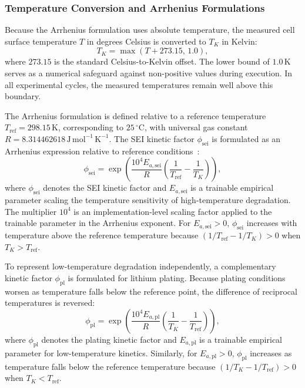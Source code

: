 \documentclass[a4paper,fleqn]{cas-sc}
\begin{document}
\subsubsection{Temperature Conversion and Arrhenius Formulations}

Because the Arrhenius formulation uses absolute temperature, the measured cell surface temperature $T$ in degrees Celsius is converted to $T_K$ in Kelvin:
\begin{equation}
T_K = \max(T + 273.15,\, 1.0),
\label{eq:kelvin}
\end{equation}
where $273.15$ is the standard Celsius-to-Kelvin offset. The lower bound of $1.0\,\mathrm{K}$ serves as a numerical safeguard against non-positive values during execution. In all experimental cycles, the measured temperatures remain well above this boundary.

The Arrhenius formulation is defined relative to a reference temperature $T_{\mathrm{ref}} = 298.15\,\mathrm{K}$, corresponding to $25\,^\circ\mathrm{C}$, with universal gas constant $R = 8.314462618\,\mathrm{J\,mol^{-1}\,K^{-1}}$. The SEI kinetic factor $\phi_{\mathrm{sei}}$ is formulated as an Arrhenius expression relative to reference conditions~\citep{kucinskis2022arrhenius}:
\begin{equation}
\phi_{\mathrm{sei}} = \exp\!\left(\frac{10^4 E_{a,\mathrm{sei}}}{R}\left(\frac{1}{T_{\mathrm{ref}}} - \frac{1}{T_K}\right)\right),
\label{eq:arrhenius-sei}
\end{equation}
where $\phi_{\mathrm{sei}}$ denotes the SEI kinetic factor and $E_{a,\mathrm{sei}}$ is a trainable empirical parameter scaling the temperature sensitivity of high-temperature degradation. The multiplier $10^4$ is an implementation-level scaling factor applied to the trainable parameter in the Arrhenius exponent. For $E_{a,\mathrm{sei}} > 0$, $\phi_{\mathrm{sei}}$ increases with temperature above the reference temperature because $(1/T_{\mathrm{ref}} - 1/T_K) > 0$ when $T_K > T_{\mathrm{ref}}$.

To represent low-temperature degradation independently, a complementary kinetic factor $\phi_{\mathrm{pl}}$ is formulated for lithium plating. Because plating conditions worsen as temperature falls below the reference point, the difference of reciprocal temperatures is reversed:
\begin{equation}
\phi_{\mathrm{pl}} = \exp\!\left(\frac{10^4 E_{a,\mathrm{pl}}}{R}\left(\frac{1}{T_K} - \frac{1}{T_{\mathrm{ref}}}\right)\right),
\label{eq:arrhenius-pl}
\end{equation}
where $\phi_{\mathrm{pl}}$ denotes the plating kinetic factor and $E_{a,\mathrm{pl}}$ is a trainable empirical parameter for low-temperature kinetics. Similarly, for $E_{a,\mathrm{pl}} > 0$, $\phi_{\mathrm{pl}}$ increases as temperature falls below the reference temperature because $(1/T_K - 1/T_{\mathrm{ref}}) > 0$ when $T_K < T_{\mathrm{ref}}$.
\end{document}
